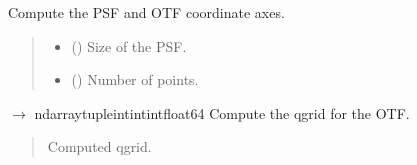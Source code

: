 \documentclass[letterpaper,10pt,english]{sphinxmanual}
\begin{document}
\begin{fulllineitems}
\begin{fulllineitems}
\end{fulllineitems}


\begin{fulllineitems}
\label{\detokenize{source/OpticalSystems:OpticalSystems.OpticalSystem.compute_psf_and_otf_cordinates}}
\pysigstartsignatures
\pysiglinewithargsret
{}
{\sphinxparamcomma {}}
{}
\pysigstopsignatures
\sphinxAtStartPar
Compute the PSF and OTF coordinate axes.
\begin{quote}\begin{description}
\begin{itemize}
\item {} 
\sphinxAtStartPar
{} () \textendash{} Size of the PSF.

\item {} 
\sphinxAtStartPar
{} () \textendash{} Number of points.

\end{itemize}

\end{description}\end{quote}

\end{fulllineitems}


\begin{fulllineitems}
\label{\detokenize{source/OpticalSystems:OpticalSystems.OpticalSystem.compute_q_grid}}
\pysigstartsignatures
\pysiglinewithargsret
{}
{}
{{ $\rightarrow$ ndarray\DUrole{p}{{[}}tuple\DUrole{p}{{[}}intintint\DUrole{p}{{]}}float64\DUrole{p}{{]}}}}
\pysigstopsignatures
\sphinxAtStartPar
Compute the q\sphinxhyphen{}grid for the OTF.
\begin{quote}\begin{description}
\sphinxAtStartPar
Computed q\sphinxhyphen{}grid.


\end{description}
\end{quote}
\end{fulllineitems}
\end{fulllineitems}
\end{document}
